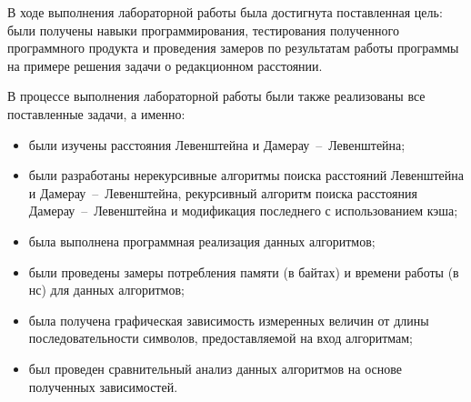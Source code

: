 \newpage

В ходе выполнения лабораторной работы была достигнута поставленная цель: были получены навыки программирования, тестирования полученного программного продукта и проведения замеров по результатам работы программы на примере решения задачи о редакционном расстоянии.

В процессе выполнения лабораторной работы были также реализованы все поставленные задачи, а именно:
\begin{itemize}
	\item были изучены расстояния Левенштейна и Дамерау~--~Левенштейна;
	\item были разработаны нерекурсивные алгоритмы поиска расстояний Левенштейна и Дамерау~--~Левенштейна, рекурсивный алгоритм поиска расстояния Дамерау~--~Левенштейна и модификация последнего с использованием кэша;
	\item была выполнена программная реализация данных алгоритмов;
	\item были проведены замеры потребления памяти (в байтах) и времени работы (в нс) для данных алгоритмов;
	\item была получена графическая зависимость измеренных величин от длины последовательности символов, предоставляемой на вход алгоритмам;
	\item был проведен сравнительный анализ данных алгоритмов на основе полученных зависимостей.
\end{itemize}

\newpage